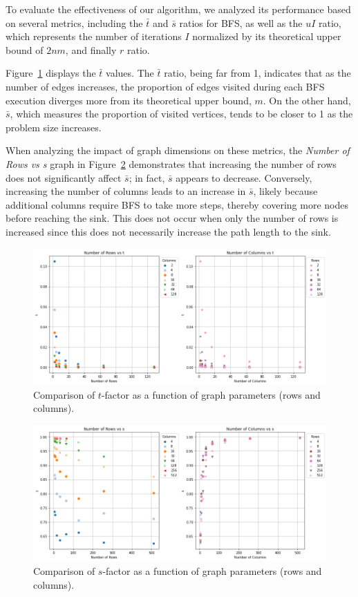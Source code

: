\documentclass{article}
\begin{document}
To evaluate the effectiveness of our algorithm, we analyzed its performance based on several metrics, including the $\bar{t}$ and $\bar{s}$ ratios for BFS, as well as the $uI$ ratio, which represents the number of iterations $I$ normalized by its theoretical upper bound of $2nm$, and finally $r$ ratio.

Figure~\ref{fig:tfactor} displays the \( \bar{t} \) values. The \( \bar{t} \) ratio, being far from 1, indicates that as the number of edges increases, the proportion of edges visited during each BFS execution diverges more from its theoretical upper bound, \( m \). On the other hand, \( \bar{s} \), which measures the proportion of visited vertices, tends to be closer to 1 as the problem size increases. 

When analyzing the impact of graph dimensions on these metrics, the \emph{Number of Rows vs s} graph in Figure~\ref{fig:sfactor} demonstrates that increasing the number of rows does not significantly affect $\bar{s}$; in fact, $\bar{s}$ appears to decrease. Conversely, increasing the number of columns leads to an increase in $\bar{s}$, likely because additional columns require BFS to take more steps, thereby covering more nodes before reaching the sink. This does not occur when only the number of rows is increased since this does not necessarily increase the path length to the sink.

\begin{figure}[H]
  \centering
  \includegraphics[width=1.0\linewidth]{t.png}
  \caption{Comparison of $t$-factor as a function of graph parameters (rows and columns).}
  \label{fig:tfactor}
\end{figure}

\begin{figure}[H]
  \centering
  \includegraphics[width=1.0\linewidth]{sfactor.png}
  \caption{Comparison of $s$-factor as a function of graph parameters (rows and columns).}
  \label{fig:sfactor}
\end{figure}
\end{document}
